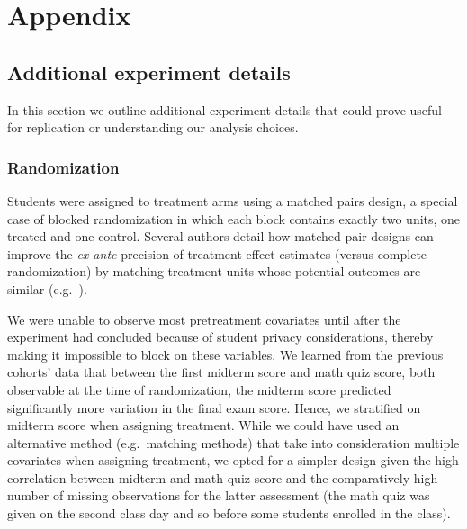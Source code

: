 \documentclass[12pt]{article}
\begin{document}

\clearpage

\section*{Appendix}

\renewcommand{\thesubsection}{\Alph{subsection}}

\setcounter{table}{0}
\renewcommand{\thetable}{A\arabic{table}}
\setcounter{figure}{0}
\renewcommand{\thefigure}{A\arabic{figure}}

\subsection{Additional experiment details}\label{subsec:additional_details}

In this section we outline additional experiment details that could prove useful for replication or understanding our analysis choices.

\subsubsection{Randomization} \label{subsubsec:a_randomization}
Students were assigned to treatment arms using a matched pairs design, a special case of blocked randomization in which each block contains exactly two units, one treated and one control.
Several authors detail how matched pair designs can improve the \textit{ex ante} precision of treatment effect estimates (versus complete randomization) by matching treatment units whose potential outcomes are similar (e.g.~\cite{ir2015,ai2017}).

We were unable to observe most pretreatment covariates until after the experiment had concluded because of student privacy considerations, thereby making it impossible to block on these variables.
We learned from the previous cohorts' data that between the first midterm score and math quiz score, both observable at the time of randomization, the midterm score predicted significantly more variation in the final exam score.
Hence, we stratified on midterm score when assigning treatment.
While we could have used an alternative method (e.g.\ matching methods) that take into consideration multiple covariates when assigning treatment, we opted for a simpler design given the high correlation between midterm and math quiz score and the comparatively high number of missing observations for the latter assessment (the math quiz was given on the second class day and so before some students enrolled in the class).
\end{document}

